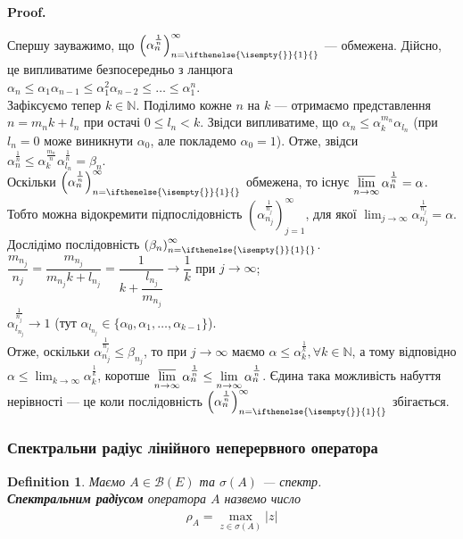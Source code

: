 \documentclass[a4paper, 10pt]{article}
\makeatletter
\theoremstyle{theoremdd}
\theoremstyle{theoremdd}
\newtheorem{definition}[theorem]{Definition}
\theoremstyle{theoremdd}
\theoremstyle{theoremdd}
\theoremstyle{theoremdd}
\theoremstyle{theoremdd}
\theoremstyle{theoremdd}
\theoremstyle{theoremdd}
\newcommand{\sequence}[2][]{\left({#2}\right)_{n=\ifthenelse{\isempty{#1}}{1}{#1}}^{\infty}}
\renewenvironment{proof}[1][Proof.\\]{\par
\pushQED{\hfill \qed}%
\normalfont \topsep6\p@\@plus6\p@\relax
\trivlist
\item\relax
{\bfseries
#1\@addpunct{.}}\hspace\labelsep\ignorespaces
}{%
\popQED\endtrivlist\@endpefalse
}
\makeatother
\begin{document}
\begin{proof}
Спершу зауважимо, що $\sequence{\alpha_n^{\frac{1}{n}}}$ --- обмежена. Дійсно, це випливатиме безпосередньо з ланцюга\\
$\alpha_n \leq \alpha_1 \alpha_{n-1} \leq \alpha_1^2 \alpha_{n-2} \leq \dots \leq \alpha_1^n$.\\
Зафіксуємо тепер $k \in \mathbb{N}$. Поділимо кожне $n$ на $k$ --- отримаємо представлення $n = m_n k + l_n$ при остачі $0 \leq l_n < k$. Звідси випливатиме, що $\alpha_n \leq \alpha_k^{m_n} \alpha_{l_n}$ (при $l_n = 0$ може виникнути $\alpha_0$, але покладемо $\alpha_0 = 1$). Отже, звідси $\alpha_n^{\frac{1}{n}} \leq \alpha_k^{\frac{m_n}{n}} \alpha_{l_n}^{\frac{1}{n}} = \beta_n$.\\
Оскільки $\sequence{\alpha_n^{\frac{1}{n}}}$ обмежена, то існує $\displaystyle\varlimsup_{n \to \infty} \alpha_n^{\frac{1}{n}} = \alpha$. Тобто можна відокремити підпослідовність $\left(\alpha_{n_j}^{\frac{1}{n_j}}\right)_{j=1}^\infty$, для якої $\displaystyle\lim_{j \to \infty} \alpha_{n_j}^{\frac{1}{n_j}} = \alpha$. Дослідімо послідовність $\sequence{\beta_n}$.\\
$\dfrac{m_{n_j}}{n_j} = \dfrac{m_{n_j}}{m_{n_j}k + l_{n_j}} = \dfrac{1}{k + \dfrac{l_{n_j}}{m_{n_j}}} \to \dfrac{1}{k}$ при $j \to \infty$;\\
$\alpha_{l_{n_j}}^{\frac{1}{n_j}} \to 1$ (тут $\alpha_{l_{n_j}} \in \{\alpha_0,\alpha_1,\dots,\alpha_{k-1}\}$).\\
Отже, оскільки $\alpha_{n_j}^{\frac{1}{n_j}} \leq \beta_{n_j}$, то при $j \to \infty$ маємо $\alpha \leq \alpha_k^{\frac{1}{k}}, \forall k \in \mathbb{N}$, а тому відповідно $\alpha \leq \displaystyle\lim_{k \to \infty} \alpha_k^{\frac{1}{k}}$, коротше $\displaystyle\varlimsup_{n \to \infty} \alpha_n^{\frac{1}{n}} \leq \lim_{n \to \infty} \alpha_n^{\frac{1}{n}}$. Єдина така можливість набуття нерівності --- це коли послідовність $\sequence{\alpha_n^{\frac{1}{n}}}$ збігається.
\end{proof}

\subsubsection{Спектральни радіус лінійного неперервного оператора}
\begin{definition}
Маємо $A \in \mathcal{B}(E)$ та $\sigma(A)$ --- спектр.\\
\textbf{Спектральним радіусом} оператора $A$ назвемо число
\begin{align*}
\rho_A = \max_{z \in \sigma(A)} |z|
\end{align*}
\end{definition}
\end{document}
